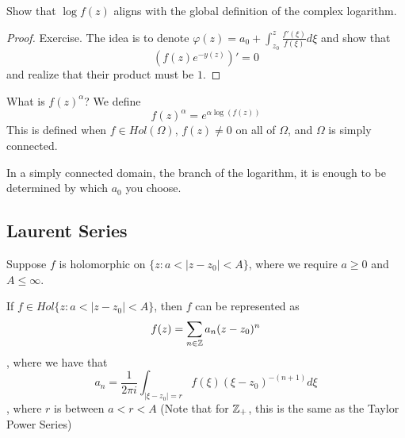 \documentclass{article}
\begin{document}
Show that $\log f(z)$ aligns with the global definition of the complex logarithm.

\begin{proof}
Exercise. The idea is to denote $\varphi(z) = a_0 + \int_{z_0}^z \frac{f'(\xi)}{f(\xi)} d\xi$ and show that
\[(f(z) e^{-y(z)})' = 0\]
and realize that their product must be $1$.
\end{proof}

\begin{definition}
    What is $f(z)^{\alpha}$? We define
    \[f(z)^{\alpha} = e^{\alpha \log(f(z))}\]
    This is defined when $f \in Hol(\Omega)$, $f(z) \neq 0$ on all of $\Omega$, and $\Omega$ is simply connected.
\end{definition}

In a simply connected domain, the branch of the logarithm, it is enough to be determined by which $a_0$ you choose.

\subsection{Laurent Series}

Suppose $f$ is holomorphic on $\{z : a < |z - z_0| < A\}$, where we require $a \geq 0$ and $A \leq \infty$.

\begin{theorem}
If $f \in Hol\{z : a < |z - z_0| < A\}$, then $f$ can be represented as
\[f(z) = \sum_{n \in \mathbb{Z}} a_n (z - z_0)^n\]
, where we have that
\[a_n = \frac{1}{2\pi i} \int_{|\xi - z_0| = r} f(\xi) (\xi - z_0)^{-(n+1)} d\xi\]
, where $r$ is between $a < r < A$ (Note that for $\mathbb{Z}_+$, this is the same as the Taylor Power Series)
\end{theorem}
\end{document}
